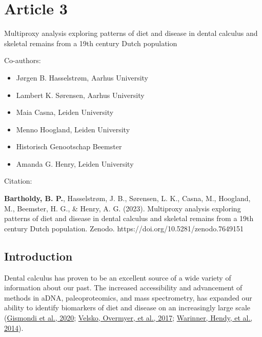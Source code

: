 \documentclass[
  letterpaper,
]{book}
\providecommand{\tightlist}{%
  \setlength{\itemsep}{0pt}\setlength{\parskip}{0pt}}
\begin{document}

\hypertarget{article-3}{%
\chapter{Article 3}\label{article-3}}

Multiproxy analysis exploring patterns of diet and disease in dental
calculus and skeletal remains from a 19th century Dutch population

\hfill\break

Co-authors:

\begin{itemize}
\tightlist
\item
  Jørgen B. Hasselstrøm, Aarhus University
\item
  Lambert K. Sørensen, Aarhus University
\item
  Maia Casna, Leiden University
\item
  Menno Hoogland, Leiden University
\item
  Historisch Genootschap Beemster
\item
  Amanda G. Henry, Leiden University
\end{itemize}

\vfill

Citation:

\textbf{Bartholdy, B. P.}, Hasselstrøm, J. B., Sørensen, L. K., Casna,
M., Hoogland, M., Beemster, H. G., \& Henry, A. G. (2023). Multiproxy
analysis exploring patterns of diet and disease in dental calculus and
skeletal remains from a 19th century Dutch population. Zenodo.
https://doi.org/10.5281/zenodo.7649151

\newpage{}

\hypertarget{mb11CalculusPilot}{%
\section{Introduction}\label{mb11CalculusPilot}}

Dental calculus has proven to be an excellent source of a wide variety
of information about our past. The increased accessibility and
advancement of methods in aDNA, paleoproteomics, and mass spectrometry,
has expanded our ability to identify biomarkers of diet and disease on
an increasingly large scale
(\protect\hyperlink{ref-gismondiMultidisciplinaryApproach2020}{Gismondi
et al., 2020}; \protect\hyperlink{ref-velskoDentalCalculus2017}{Velsko,
Overmyer, et al., 2017};
\protect\hyperlink{ref-warinnerEvidenceMilk2014}{Warinner, Hendy, et
al., 2014}).
\end{document}
